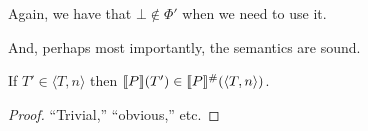 Again, we have that $\bot \not \in \Phi'$ when we need to use it.
\begin{proposition}[todo]
\end{proposition}

And, perhaps most importantly, the semantics are sound.
\begin{theorem}[Soundness]
If $T' \in \langle T, n \rangle$ then $\den{P}(T') \in \den{P}^\#(\langle T, n \rangle)$.
\end{theorem}
\begin{proof}
``Trivial,'' ``obvious,'' etc.
\end{proof}

